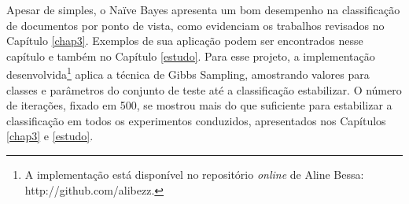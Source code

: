 Apesar de simples, o Naïve Bayes apresenta um bom desempenho na classificação de documentos por ponto de vista, como evidenciam os trabalhos revisados no Capítulo \ref{chap3}. Exemplos de sua aplicação podem ser encontrados nesse capítulo e também no Capítulo \ref{estudo}. Para esse projeto, a implementação desenvolvida\footnote{A implementação está disponível no repositório \emph{online} de Aline Bessa: http://github.com/alibezz.} aplica a técnica de Gibbs Sampling, amostrando valores para classes e parâmetros do conjunto de teste até a classificação estabilizar. O número de iterações, fixado em 500, se mostrou mais do que suficiente para estabilizar a classificação em todos os experimentos conduzidos, apresentados nos Capítulos \ref{chap3} e \ref{estudo}. 




